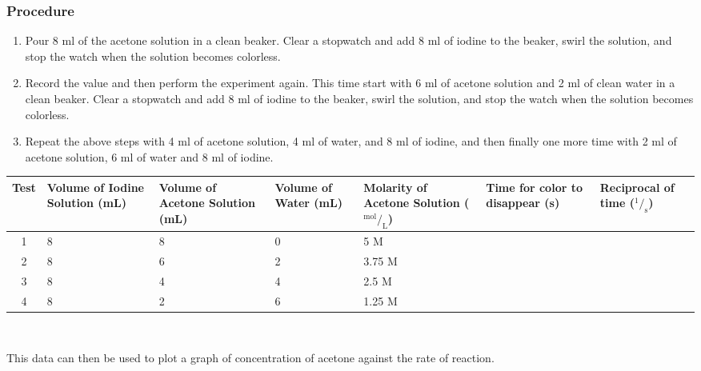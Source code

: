 \subsubsection{Procedure}
\begin{enumerate}
\item Pour 8 ml of the acetone solution in a clean beaker. Clear a stopwatch and add 8 ml of iodine to the beaker, swirl the solution, and stop the watch when the solution becomes colorless. 
\item Record the value and then perform the experiment again. This time start with 6 ml of acetone solution and 2 ml of clean water in a clean beaker. Clear a stopwatch and add 8 ml of iodine to the beaker, swirl the solution, and stop the watch when the solution becomes colorless.
\item  Repeat the above steps with 4 ml of acetone solution, 4 ml of water, and 8 ml of iodine, and then finally one more time with 2 ml of acetone solution, 6 ml of water and 8 ml of iodine.
\end{enumerate}

\begin{center}
\begin{tabular}{|c|p{2cm}|p{2cm}|p{2cm}|p{2cm}|p{2cm}|p{1.5cm}|} \hline
Test&Volume of Iodine Solution (mL)&Volume of Acetone Solution (mL)&Volume of Water (mL)&Molarity of Acetone Solution ($^{\text{mol}}/_\text{L}$)&Time for color to disappear (s)&Reciprocal of time ($^1/_\text{s}$) \\ \hline
1&8&8&0&5 M&& \\ \hline
2&8&6&2&3.75 M&& \\ \hline
3&8&4&4&2.5 M&& \\ \hline
4&8&2&6&1.25 M&& \\ \hline
\end{tabular} \\[10pt]
\end{center}

This data can then be used to plot a graph of concentration of acetone against the rate of reaction.

